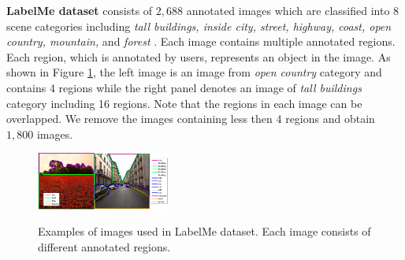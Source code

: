 \textbf{LabelMe dataset} consists of $2,688$ annotated
images which are classified into 8 scene categories including \emph{tall
buildings, inside city, street, highway, coast, open country, mountain,}
and \emph{forest} \cite{Oliva-2001} . Each image contains multiple
annotated regions. Each region, which is annotated by users, represents
an object in the image.  As shown in Figure \ref{fig: LabelMeExample}, the left
image is an image from \emph{open country }category and contains
4 regions while the right panel denotes an image of \emph{tall buildings}
category including 16 regions. Note that the regions in each image can
be overlapped. We remove the images containing less then 4 regions
and obtain $1,800$ images. 

\begin{figure}
\centering{}\includegraphics[width=0.17\textwidth]{LabelMeSample_new}\qquad{}\qquad{}\includegraphics[width=0.22\textwidth]{LabelMeSample2_new}\caption{Examples of images used in LabelMe dataset. Each image consists of
different annotated regions.\label{fig: LabelMeExample}}
\end{figure}

